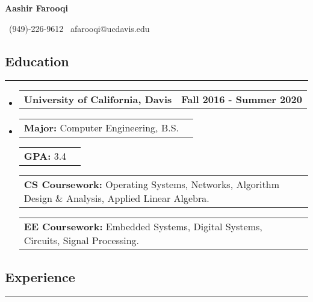 \documentclass[10pt,letterpaper]{article}
\makeatletter
\newcommand{\items}[2]
{
	\begin{tabular*}{\linewidth}{l @{\extracolsep{\fill}} r}
		#1 & #2 \\
	\end{tabular*}
}
\newcommand{\header}[2]
{
	\begin{tabular*}{\linewidth}{l @{\extracolsep{\fill}} r}
		\hspace{-27pt} #1 & #2 \\
	\end{tabular*}
}
\newcommand{\sectionbreak}
{
	\vspace{-1.2em}
	\rule{\textwidth}{1.7pt}
	\vspace{-1.7em}
}
\makeatother
\begin{document}
\begin{center}
	{\LARGE \textbf{Aashir Farooqi}}

	\vspace{0.5em}
	\ (949)-226-9612 \textbar 
	\ afarooqi@ucdavis.edu\textbar
	\ \href{https://www.linkedin.com/in/aashir-farooqi-4b067b139/}{\emph{\underline{}}}
	\\
\end{center}
\vspace{-27.5pt}


\subsection*{Education}
\sectionbreak

\begin{itemize}

	\item[] 
		\header
		{\textbf{University of California, Davis}}
		{\textbf{Fall 2016 - Summer 2020}}
	\item[]
		\vspace{-2.5pt}
	\items
		{\textbf{Major:} Computer Engineering, B.S.}
		{}
	\items
		{\textbf{GPA:} 3.4}
		{}
	\items
		{\textbf{CS Coursework:} Operating Systems, Networks, Algorithm Design \& Analysis, Applied Linear Algebra. }
		{}
	\items
		{\textbf{EE Coursework:} Embedded Systems, Digital Systems, Circuits, Signal Processing.}
		{}
		{\vspace{-0.6em}}

\end{itemize}

\vspace{-24.65pt}

\subsection*{Experience}
\sectionbreak
\end{document}
